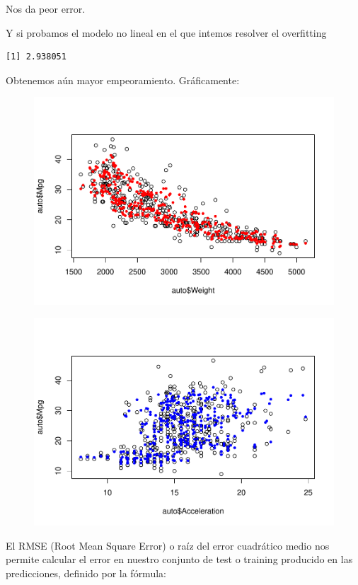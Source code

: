 Nos da peor error.

Y si probamos el modelo no lineal en el que intemos resolver el overfitting

\begin{verbatim}
[1] 2.938051
\end{verbatim}

Obtenemos aún mayor empeoramiento. Gráficamente:

\begin{figure}[H]\includegraphics[width=.9\linewidth]{img/Regresion_files/figure-latex/unnamed-chunk-32-1} \caption{}\end{figure}

\begin{figure}[H]\includegraphics[width=.9\linewidth]{img/Regresion_files/figure-latex/unnamed-chunk-32-2} \caption{}\end{figure}

El RMSE (Root Mean Square Error) o raíz del error cuadrático medio nos permite calcular el error en nuestro conjunto de test o training producido en las predicciones, definido por la fórmula:

